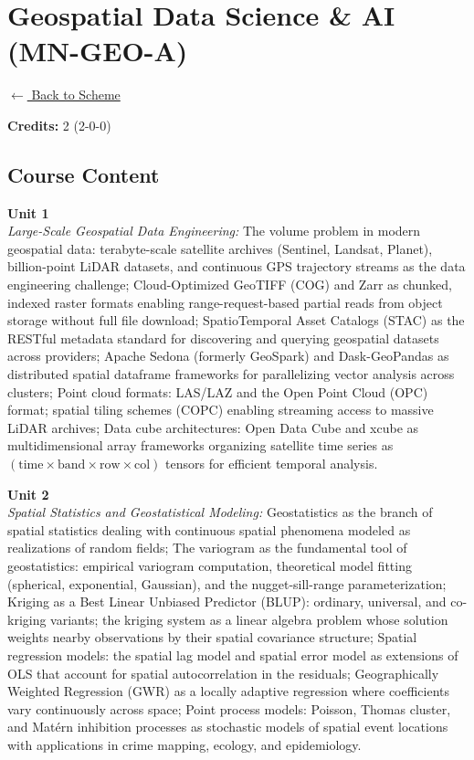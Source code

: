 \section*{Geospatial Data Science \& AI (MN-GEO-A)}
\label{minor:GEO_L2}

\noindent \small{\hyperref[main:scheme]{$\leftarrow$ Back to Scheme}} \vspace{0.5cm}

\noindent \textbf{Credits:} 2 (2-0-0)

\subsection*{Course Content}
\noindent\textbf{Unit 1} \\
\textit{Large-Scale Geospatial Data Engineering:} The volume problem in modern geospatial data: terabyte-scale satellite archives (Sentinel, Landsat, Planet), billion-point LiDAR datasets, and continuous GPS trajectory streams as the data engineering challenge; Cloud-Optimized GeoTIFF (COG) and Zarr as chunked, indexed raster formats enabling range-request-based partial reads from object storage without full file download; SpatioTemporal Asset Catalogs (STAC) as the RESTful metadata standard for discovering and querying geospatial datasets across providers; Apache Sedona (formerly GeoSpark) and Dask-GeoPandas as distributed spatial dataframe frameworks for parallelizing vector analysis across clusters; Point cloud formats: LAS/LAZ and the Open Point Cloud (OPC) format; spatial tiling schemes (COPC) enabling streaming access to massive LiDAR archives; Data cube architectures: Open Data Cube and xcube as multidimensional array frameworks organizing satellite time series as $(\text{time} \times \text{band} \times \text{row} \times \text{col})$ tensors for efficient temporal analysis.

\vspace{0.3cm}

\noindent\textbf{Unit 2} \\
\textit{Spatial Statistics and Geostatistical Modeling:} Geostatistics as the branch of spatial statistics dealing with continuous spatial phenomena modeled as realizations of random fields; The variogram as the fundamental tool of geostatistics: empirical variogram computation, theoretical model fitting (spherical, exponential, Gaussian), and the nugget-sill-range parameterization; Kriging as a Best Linear Unbiased Predictor (BLUP): ordinary, universal, and co-kriging variants; the kriging system as a linear algebra problem whose solution weights nearby observations by their spatial covariance structure; Spatial regression models: the spatial lag model and spatial error model as extensions of OLS that account for spatial autocorrelation in the residuals; Geographically Weighted Regression (GWR) as a locally adaptive regression where coefficients vary continuously across space; Point process models: Poisson, Thomas cluster, and Matérn inhibition processes as stochastic models of spatial event locations with applications in crime mapping, ecology, and epidemiology.

